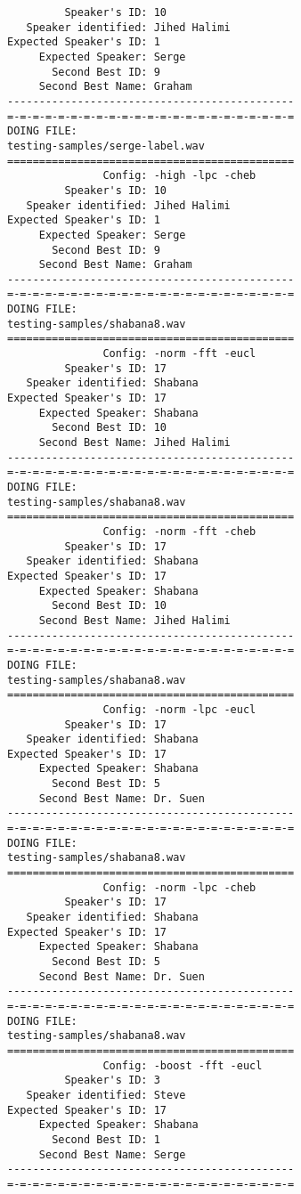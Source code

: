 \begin{verbatim}
         Speaker's ID: 10
   Speaker identified: Jihed Halimi
Expected Speaker's ID: 1
     Expected Speaker: Serge
       Second Best ID: 9
     Second Best Name: Graham
---------------------------------------------
=-=-=-=-=-=-=-=-=-=-=-=-=-=-=-=-=-=-=-=-=-=-=
DOING FILE:
testing-samples/serge-label.wav
=============================================
               Config: -high -lpc -cheb
         Speaker's ID: 10
   Speaker identified: Jihed Halimi
Expected Speaker's ID: 1
     Expected Speaker: Serge
       Second Best ID: 9
     Second Best Name: Graham
---------------------------------------------
=-=-=-=-=-=-=-=-=-=-=-=-=-=-=-=-=-=-=-=-=-=-=
DOING FILE:
testing-samples/shabana8.wav
=============================================
               Config: -norm -fft -eucl
         Speaker's ID: 17
   Speaker identified: Shabana
Expected Speaker's ID: 17
     Expected Speaker: Shabana
       Second Best ID: 10
     Second Best Name: Jihed Halimi
---------------------------------------------
=-=-=-=-=-=-=-=-=-=-=-=-=-=-=-=-=-=-=-=-=-=-=
DOING FILE:
testing-samples/shabana8.wav
=============================================
               Config: -norm -fft -cheb
         Speaker's ID: 17
   Speaker identified: Shabana
Expected Speaker's ID: 17
     Expected Speaker: Shabana
       Second Best ID: 10
     Second Best Name: Jihed Halimi
---------------------------------------------
=-=-=-=-=-=-=-=-=-=-=-=-=-=-=-=-=-=-=-=-=-=-=
DOING FILE:
testing-samples/shabana8.wav
=============================================
               Config: -norm -lpc -eucl
         Speaker's ID: 17
   Speaker identified: Shabana
Expected Speaker's ID: 17
     Expected Speaker: Shabana
       Second Best ID: 5
     Second Best Name: Dr. Suen
---------------------------------------------
=-=-=-=-=-=-=-=-=-=-=-=-=-=-=-=-=-=-=-=-=-=-=
DOING FILE:
testing-samples/shabana8.wav
=============================================
               Config: -norm -lpc -cheb
         Speaker's ID: 17
   Speaker identified: Shabana
Expected Speaker's ID: 17
     Expected Speaker: Shabana
       Second Best ID: 5
     Second Best Name: Dr. Suen
---------------------------------------------
=-=-=-=-=-=-=-=-=-=-=-=-=-=-=-=-=-=-=-=-=-=-=
DOING FILE:
testing-samples/shabana8.wav
=============================================
               Config: -boost -fft -eucl
         Speaker's ID: 3
   Speaker identified: Steve
Expected Speaker's ID: 17
     Expected Speaker: Shabana
       Second Best ID: 1
     Second Best Name: Serge
---------------------------------------------
=-=-=-=-=-=-=-=-=-=-=-=-=-=-=-=-=-=-=-=-=-=-=

\end{verbatim}
